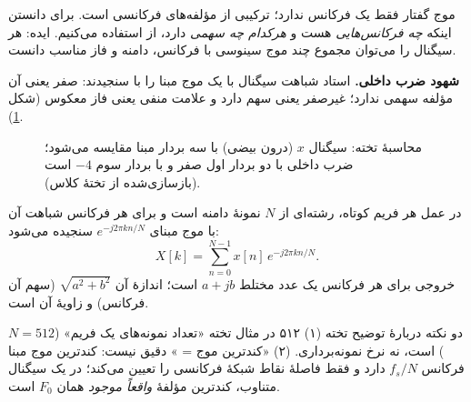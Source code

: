موج گفتار فقط یک فرکانس ندارد؛ ترکیبی از مؤلفه‌های فرکانسی است. برای دانستن اینکه \emph{چه فرکانس‌هایی} هست و \emph{هرکدام چه سهمی} دارد، از  استفاده می‌کنیم. ایده: هر سیگنال را می‌توان مجموع چند موج سینوسی با فرکانس، دامنه و فاز مناسب دانست.


\textbf{شهود ضرب داخلی.} استاد شباهت سیگنال با یک موج مبنا را با  سنجیدند: صفر یعنی آن مؤلفه سهمی ندارد؛ غیرصفر یعنی سهم دارد و علامت منفی یعنی فاز معکوس (شکل \ref{fig:ch03-dot-example}).

\begin{figure}[htbp]
\centering
{}
\caption{محاسبهٔ تخته: سیگنال $x$ (درون بیضی) با سه بردار مبنا مقایسه می‌شود؛ ضرب داخلی با دو بردار اول صفر و با بردار سوم $-4$ است (بازسازی‌شده از تختهٔ کلاس).}
\label{fig:ch03-dot-example}
\end{figure}

در عمل هر فریم کوتاه، رشته‌ای از $N$ نمونهٔ دامنه است و برای هر فرکانس شباهت آن با موج مبنای $e^{-j2\pi kn/N}$ سنجیده می‌شود:
\[
X[k]=\sum_{n=0}^{N-1}x[n]\,e^{-j2\pi kn/N}.
\]
خروجی برای هر فرکانس یک عدد مختلط $a+jb$ است؛ اندازهٔ آن  $\sqrt{a^2+b^2}$ (سهم آن فرکانس) و زاویهٔ آن  است.

\begin{correctionbox}{دو نکته دربارهٔ توضیح تخته}
(۱) ۵۱۲ در مثال تخته «تعداد نمونه‌های یک فریم» ($N=512$) است، نه نرخ نمونه‌برداری. (۲) «کندترین موج = » دقیق نیست: کندترین موج مبنا فرکانس $f_s/N$ دارد و فقط فاصلهٔ نقاط شبکهٔ فرکانسی را تعیین می‌کند؛ در یک سیگنال متناوب، کندترین مؤلفهٔ \emph{واقعاً موجود} همان $F_0$ است.
\end{correctionbox}

